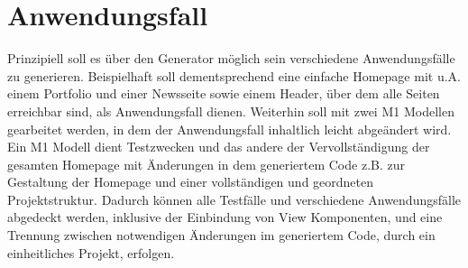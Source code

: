 \section{Anwendungsfall}
\label{Anwendungsfall}
Prinzipiell soll es über den Generator möglich sein verschiedene Anwendungsfälle
zu generieren. Beispielhaft soll dementsprechend eine
einfache Homepage mit u.A.
einem Portfolio und einer Newsseite sowie einem Header, über dem alle Seiten
erreichbar sind, als Anwendungsfall dienen. Weiterhin soll mit zwei
M1 Modellen gearbeitet werden, in dem der Anwendungsfall inhaltlich leicht
abgeändert wird.
Ein M1 Modell dient Testzwecken und das andere der Vervollständigung der
gesamten Homepage mit Änderungen in dem generiertem Code z.B. zur Gestaltung der
Homepage und einer vollständigen und geordneten Projektstruktur.
Dadurch können alle Testfälle und verschiedene Anwendungsfälle abgedeckt werden,
inklusive der Einbindung von View Komponenten, und eine Trennung zwischen notwendigen Änderungen im
generiertem Code, durch ein einheitliches Projekt, erfolgen.